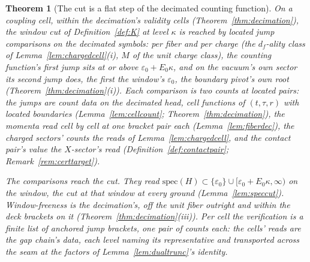 \documentclass[11pt]{article}
\newtheorem{theorem}{Theorem}
\theoremstyle{definition}
\begin{document}
\begin{theorem}[The cut is a flat step of the decimated counting
function]\label{thm:flatstep}
On a coupling cell, within the decimation's validity cells
(Theorem~\ref{thm:decimation}), the window cut of Definition~\ref{def:K} at level
$\kappa$ is reached by located jump comparisons on the decimated symbols:
per fiber and per charge (the $d_f$-ality class of
Lemma~\ref{lem:chargedcell}(i), $M$ of the unit charge class), the
counting
function's first jump sits at or above $\varepsilon_0+E_0\kappa$, and on the vacuum's
own sector its second jump does, the first the window's
$\varepsilon_0$, the boundary pivot's own root
(Theorem~\ref{thm:decimation}(i)). Each comparison is two counts at located
pairs: the jumps are count data on the decimated head, cell functions
of $(t,\tau,r)$ with located boundaries (Lemma~\ref{lem:cellcount};
Theorem~\ref{thm:decimation}), the momenta read cell by cell at one
bracket pair each (Lemma~\ref{lem:fiberdec}), the charged sectors' counts the reads
of Lemma~\ref{lem:chargedcell}, and the contact pair's value the
$X$-sector's read (Definition~\ref{def:contactpair};
Remark~\ref{rem:certtarget}).

\emph{The comparisons reach the cut.} They read
$\mathrm{spec}(H)\subset\{\varepsilon_0\}\cup
[\varepsilon_0+E_0\kappa,\infty)$ on the window, the cut at that
window at every ground (Lemma~\ref{lem:speccut}).
Window-freeness is the decimation's, off the
unit fiber outright and within the deck brackets on it
(Theorem~\ref{thm:decimation}(iii)). Per cell the verification is a finite
list of anchored jump brackets, one pair of counts each: the cells'
reads are the gap chain's data, each level naming its representative and
transported across the seam at the factors of
Lemma~\ref{lem:dualtrunc}'s identity.

\end{theorem}
\end{document}
